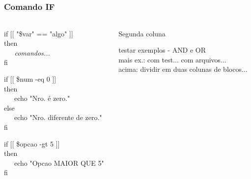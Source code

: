 \documentclass[aspectratio=1610]{beamer}
\begin{document}
\section [IF]{}
\begin{frame}
  \frametitle{Comando IF} \vspace{-0.3cm}     %
  \framesubtitle{}
\begin{columns}
    \begin{column}{0.45\textwidth}   %
       \begin{block}{}
	      if [[ "\$var" == "algo" ]]\\
	      then\\
		      \textit{\ \ \ comandos...}\\
	      fi\\
        \end{block}

        \begin{block}{}
	      if [[ \$num -eq 0 ]]\\
	      then\\
		      \ \ \ echo "Nro. é zero."\\
	      else\\
		      \ \ \ echo "Nro. diferente de zero."\\
	      fi\\
        \end{block}
        
        \begin{block}{}
	      if [[ \$opcao -gt 5 ]]\\
	      then\\
		       \ \ \ echo "Opcao MAIOR QUE 5"\\
	      fi\\
        \end{block}
    \end{column}
        
\begin{column}{0.45\textwidth}
    Segunda coluna
        \begin{block}{}
	      testar exemplos - AND e OR\\
	      mais ex.: com test... com arquivos... 	\\
	      acima: dividir em duas colunas de blocos...\\
        \end{block}
\end{column}

\end{columns}
\end{frame}
\end{document}
